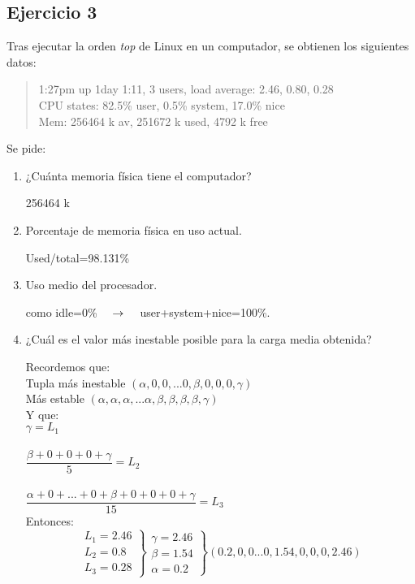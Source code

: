 \subsection{Ejercicio 3}
\noindent
Tras ejecutar la orden \textit{top} de Linux en un computador, se obtienen los siguientes datos:\\
\begin{quote}
    1:27pm up 1day 1:11, 3 users, load average: 2.46, 0.80, 0.28\\
    CPU states: 82.5\% user, 0.5\% system, 17.0\% nice\\
    Mem: 256464 k av, 251672 k used, 4792 k free\\
\end{quote}

Se pide:
\begin{enumerate}
    \item ¿Cuánta memoria física tiene el computador?
\begin{tcolorbox}[colback=white,colframe=cyan!50!black,fonttitle=\bfseries]
256464 k
\end{tcolorbox}    
    \item Porcentaje de memoria física en uso actual.
\begin{tcolorbox}[colback=white,colframe=cyan!50!black,fonttitle=\bfseries]
Used/total=98.131\%
\end{tcolorbox}    
    \item Uso medio del procesador.
\begin{tcolorbox}[colback=white,colframe=cyan!50!black,fonttitle=\bfseries]
como idle=0\% $\quad\rightarrow\quad$ user+system+nice=100\%.
\end{tcolorbox}    
    \item ¿Cuál es el valor más inestable posible para la carga media obtenida?
\begin{tcolorbox}[colback=white,colframe=cyan!50!black,fonttitle=\bfseries]
Recordemos que:\\
Tupla más inestable $(\alpha,0,0,...0,\beta,0,0,0,\gamma)$\\
Más estable $(\alpha,\alpha,\alpha,...\alpha,\beta,\beta,\beta,\beta,\gamma)$\\
Y que:\\
$\gamma = L_1$\\\\
$\dfrac{\beta+0+0+0+\gamma}{5} = L_2$\\\\
$\dfrac{\alpha+0+...+0+\beta+0+0+0+\gamma}{15} = L_3$\\Entonces:
\[\left.\begin{array}{lll}
L_1=2.46\\
L_2=0.8\\
L_3=0.28
\end{array}\right\rbrace\left.\begin{array}{lll}
\gamma=2.46\\
\beta=1.54\\
\alpha=0.2
\end{array}\right\rbrace(0{.}2,0,0...0,1{.}54,0,0,0,2{.}46)
\]
\end{tcolorbox}    
\end{enumerate}
